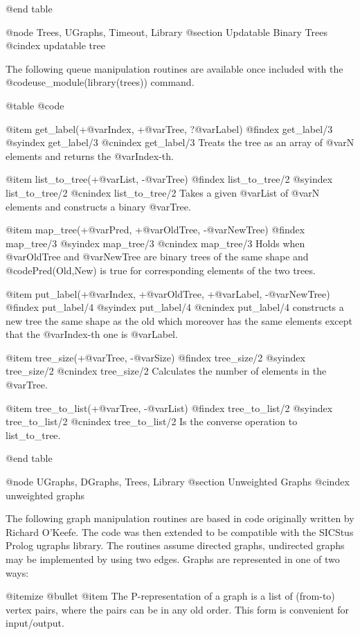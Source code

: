 {{{{{{{{{@end table

@node Trees, UGraphs, Timeout, Library
@section Updatable Binary Trees
@cindex updatable tree

The following queue manipulation routines are available once
included with the @code{use_module(library(trees))} command.

@table @code

@item get_label(+@var{Index}, +@var{Tree}, ?@var{Label})
@findex get_label/3
@syindex get_label/3
@cnindex get_label/3
Treats the tree as an array of @var{N} elements and returns the
@var{Index}-th.

@item list_to_tree(+@var{List}, -@var{Tree})
@findex list_to_tree/2
@syindex list_to_tree/2
@cnindex list_to_tree/2
Takes a given @var{List} of @var{N} elements and constructs a binary
@var{Tree}.

@item map_tree(+@var{Pred}, +@var{OldTree}, -@var{NewTree})
@findex map_tree/3
@syindex map_tree/3
@cnindex map_tree/3
Holds when @var{OldTree} and @var{NewTree} are binary trees of the same shape
and @code{Pred(Old,New)} is true for corresponding elements of the two trees.

@item put_label(+@var{Index}, +@var{OldTree}, +@var{Label}, -@var{NewTree})
@findex put_label/4
@syindex put_label/4
@cnindex put_label/4
constructs a new tree the same shape as the old which moreover has the
same elements except that the @var{Index}-th one is @var{Label}.

@item tree_size(+@var{Tree}, -@var{Size})
@findex tree_size/2
@syindex tree_size/2
@cnindex tree_size/2
Calculates the number of elements in the @var{Tree}.

@item tree_to_list(+@var{Tree}, -@var{List})
@findex tree_to_list/2
@syindex tree_to_list/2
@cnindex tree_to_list/2
Is the converse operation to list_to_tree.

@end table

@node UGraphs, DGraphs, Trees, Library
@section Unweighted Graphs
@cindex unweighted graphs

The following graph manipulation routines are based in code originally
written by Richard O'Keefe. The code was then extended to be compatible
with the SICStus Prolog ugraphs library. The routines assume directed
graphs, undirected graphs may be implemented by using two edges. Graphs
are represented in one of two ways:

@itemize @bullet
@item The P-representation of a graph is a list of (from-to) vertex
pairs, where the pairs can be in any old order.  This form is
convenient for input/output.
 
}}}}}}}}}

